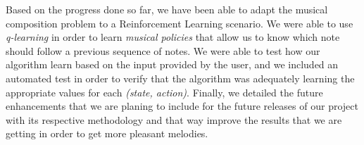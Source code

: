 Based on the progress done so far, we have been able to adapt the musical composition problem to a Reinforcement Learning scenario. We were able to use \emph{q-learning} in order to learn \emph{musical policies} that allow us to know which note should follow a previous sequence of notes. We were able to test how our algorithm learn based on the input provided by the user, and we included an automated test in order to verify that the algorithm was adequately learning the appropriate values for each \emph{(state, action)}. Finally, we detailed the future enhancements that we are planing to include for the future releases of our project with its respective methodology and that way improve the results that we are getting in order to get more pleasant melodies.